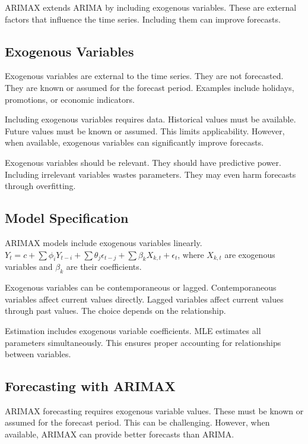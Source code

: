 ARIMAX extends ARIMA by including exogenous variables. These are external factors that influence the time series. Including them can improve forecasts.

\subsection{Exogenous Variables}

Exogenous variables are external to the time series. They are not forecasted. They are known or assumed for the forecast period. Examples include holidays, promotions, or economic indicators.

Including exogenous variables requires data. Historical values must be available. Future values must be known or assumed. This limits applicability. However, when available, exogenous variables can significantly improve forecasts.

Exogenous variables should be relevant. They should have predictive power. Including irrelevant variables wastes parameters. They may even harm forecasts through overfitting.

\subsection{Model Specification}

ARIMAX models include exogenous variables linearly. \(Y_t = c + \sum \phi_i Y_{t-i} + \sum \theta_j \epsilon_{t-j} + \sum \beta_k X_{k,t} + \epsilon_t\), where \(X_{k,t}\) are exogenous variables and \(\beta_k\) are their coefficients.

Exogenous variables can be contemporaneous or lagged. Contemporaneous variables affect current values directly. Lagged variables affect current values through past values. The choice depends on the relationship.

Estimation includes exogenous variable coefficients. MLE estimates all parameters simultaneously. This ensures proper accounting for relationships between variables.

\subsection{Forecasting with ARIMAX}

ARIMAX forecasting requires exogenous variable values. These must be known or assumed for the forecast period. This can be challenging. However, when available, ARIMAX can provide better forecasts than ARIMA.

